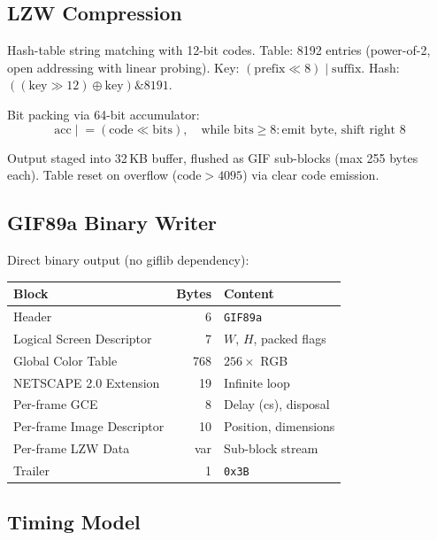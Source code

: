\documentclass[11pt,a4paper]{article}
\begin{document}
\subsection{LZW Compression}

Hash-table string matching with 12-bit codes.
Table: 8192 entries (power-of-2, open addressing with linear probing).
Key: $(\mathrm{prefix} \ll 8) \mathbin{|} \mathrm{suffix}$.
Hash: $((\mathrm{key} \gg 12) \oplus \mathrm{key}) \mathbin{\&} 8191$.

\medskip
\noindent Bit packing via 64-bit accumulator:
\begin{equation}
  \mathrm{acc} \mathrel{|}= (\mathrm{code} \ll \mathrm{bits}), \quad
  \text{while } \mathrm{bits} \geq 8: \text{emit byte, shift right 8}
\end{equation}

Output staged into 32\,KB buffer, flushed as GIF sub-blocks
(max 255 bytes each). Table reset on overflow ($\mathrm{code} > 4095$)
via clear code emission.

\subsection{GIF89a Binary Writer}

Direct binary output (no giflib dependency):
\begin{center}
\begin{tabular}{@{}lrl@{}}
\toprule
  Block & Bytes & Content \\
\midrule
  Header & 6 & \texttt{GIF89a} \\
  Logical Screen Descriptor & 7 & $W$, $H$, packed flags \\
  Global Color Table & 768 & $256 \times$ RGB \\
  NETSCAPE 2.0 Extension & 19 & Infinite loop \\
  Per-frame GCE & 8 & Delay (cs), disposal \\
  Per-frame Image Descriptor & 10 & Position, dimensions \\
  Per-frame LZW Data & var & Sub-block stream \\
  Trailer & 1 & \texttt{0x3B} \\
\bottomrule
\end{tabular}
\end{center}

\subsection{Timing Model}
\end{document}
